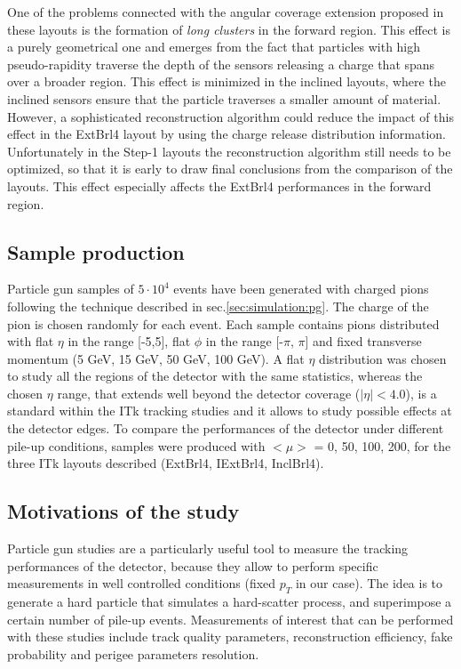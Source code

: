 \documentclass[a4paper,twoside,12pt]{article}
\begin{document}
One of the problems connected with the angular coverage extension proposed in these layouts is the formation of \textit{long clusters} in the forward region. This effect is a purely 
geometrical one and emerges from the fact that particles with high pseudo-rapidity traverse the depth of the sensors releasing a charge that spans over a broader region. This effect is
minimized in the inclined layouts, where the inclined sensors ensure that the particle traverses a smaller amount of material. However, a sophisticated reconstruction algorithm could reduce
the impact of this effect in the ExtBrl4 layout by using the charge release distribution information. Unfortunately in the Step-1 layouts the reconstruction algorithm still needs to be optimized,
so that it is early to draw final conclusions from the comparison of the layouts. This effect especially affects the ExtBrl4 performances in the forward region.\\

\subsection{Sample production}\label{sec:tracking:sampleProduction}
Particle gun samples of $5\cdot 10^4$ events have been generated with charged pions following the technique described in sec.\ref{sec:simulation:pg}. The charge of the pion
is chosen randomly for each event.
Each sample contains pions distributed with flat $\eta$ in the range [-5,5], flat $\phi$ in the range [-$\pi$, $\pi$] and fixed transverse momentum (5 GeV, 15 GeV, 50 GeV, 100 GeV). 
A flat $\eta$ distribution was chosen to study all the regions of the detector with the same statistics, whereas the chosen $\eta$ range, that extends well beyond the detector coverage ($|\eta| < 4.0$),
is a standard within the ITk tracking studies and it allows to study possible effects at the detector edges. 
To compare the performances of the detector under different pile-up conditions, samples were produced with $<\mu>$ = 0, 50, 100, 200, for the three ITk layouts described (ExtBrl4,
IExtBrl4, InclBrl4).

\subsection{Motivations of the study}
Particle gun studies are a particularly useful tool to measure the tracking performances of the detector, because they allow to perform
specific measurements in well controlled conditions (fixed $p_{T}$ in our case). The idea is to generate a hard particle that
simulates a hard-scatter process, and superimpose a certain number of pile-up events. Measurements of interest that can be performed 
with these studies include track quality parameters, reconstruction efficiency, fake probability and perigee parameters resolution.\\
\end{document}
